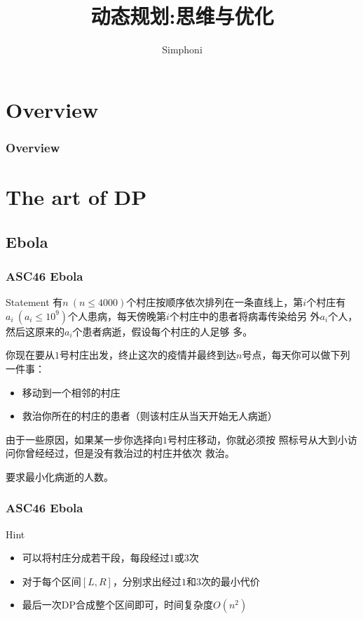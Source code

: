 \documentclass{beamer}
\title[动态规划:思维与优化]{动态规划:思维与优化}
\author[Simphoni]{Simphoni}
\begin{document}
\maketitle
\section{Overview}
\begin{frame}
  \frametitle{Overview}
  \centering
  \tableofcontents
\end{frame}

\section{The art of DP}

\subsection{Ebola}
\begin{frame}
  \frametitle{ASC46 Ebola}
  \begin{block}{Statement}
    \setlength{\parindent}{2em}
    有$n\ (n\le 4000)$个村庄按顺序依次排列在一条直线上，第$i$个村庄有
    $a_i\ (a_i\le 10^9)$个人患病，每天傍晚第$i$个村庄中的患者将病毒传染给\alert{另
      外}$a_i$个人，然后这原来的$a_i$个患者病逝，假设每个村庄的人足够
    多。
    
    你现在要从$1$号村庄出发，终止这次的疫情并最终到达$n$号点，每天你可以做下列一件事：
    \begin{itemize}
    \item 移动到一个相邻的村庄
    \item 救治你所在的村庄的患者（则该村庄从当天开始无人病逝）
    \end{itemize}
    由于一些原因，如果某一步你选择向$1$号村庄移动，你就必须按
    照标号从大到小访问你\alert{曾经经过，但是没有救治过}的村庄并依次
    救治。
    
    要求最小化病逝的人数。
  \end{block}
\end{frame}

\begin{frame}
  \frametitle{ASC46 Ebola}
  \begin{block}{Hint}
    \begin{itemize}
    \item 可以将村庄分成若干段，每段经过$1$或$3$次 \pause
    \item 对于每个区间$[L,R]$，分别求出经过$1$和$3$次的最小代价 \pause
    \item 最后一次DP合成整个区间即可，时间复杂度$O(n^2)$
    \end{itemize}
  \end{block}
\end{frame}
\end{document}
